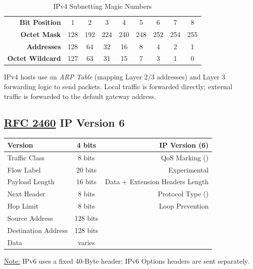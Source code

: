 \documentclass[12pt]{article}
\newif\ifcolor											%
\newcommand{\note}[1]{\ifcolor \colorbox{#1}{Note:}\else \underline{Note:}\fi}
\newcommand{\RFC}[1]{\href{https://datatracker.ietf.org/doc/html/rfc#1}{RFC #1}}
\begin{document}
	\begin{table}[H]
	\centering
	\caption{IPv4 Subnetting Magic Numbers \label{tab:SUBNETTING}}
	\begin{tabular}{@{} r | c c c c c c c c @{}}\hline
	\textbf{Bit Position}	& 1	& 2	& 3	& 4	& 5	& 6	& 7 & 8\\
	\textbf{Octet Mask}	& 128 & 192 & 224 & 240 & 248 & 252 & 254 & 255\\
	\textbf{Addresses}	& 128	& 64	& 32	& 16	& 8	& 4	& 2	& 1\\
	\textbf{Octet Wildcard}	& 127	& 63	& 31 	& 15	& 7	& 3	& 1	& 0\\\hline
	\end{tabular}\end{table}

	IPv4 hosts use an \textit{ARP Table} (mapping Layer 2/3 addresses) and Layer 3 forwarding logic to send packets. Local traffic is forwarded directly; external traffic is forwarded to the default gateway address.


	\subsection[RFC 2460 IPv6]{\RFC{2460} IP Version 6 \label{subsec:IPV6}}
	\begin{table}[H]
	\centering
	\begin{tabular}{| l | c | r |}\hline
	Version			& 4 bits	& IP Version (6)\\\hline
	Traffic Class			& 8 bits	& QoS Marking (\Cref{sec:QOS})\\\hline
	Flow Label			& 20 bits	& Experimental\\\hline
	Payload Length		& 16 bits	& Data + Extension Headers Length\\\hline
	Next Header		& 8 bits	& Protocol Type (\Cref{tab:L3 PROTOCOL})\\\hline
	Hop Limit			& 8 bits	& Loop Prevention\\\hline
	Source Address		& 128 bits	&\\\hline
	Destination Address	& 128 bits	&\\\hline
	Data				& varies	&\\\hline
	\end{tabular}\end{table}
	\note{Goldenrod} IPv6 uses a fixed 40-Byte header; IPv6 Options headers are sent separately.
\end{document}
